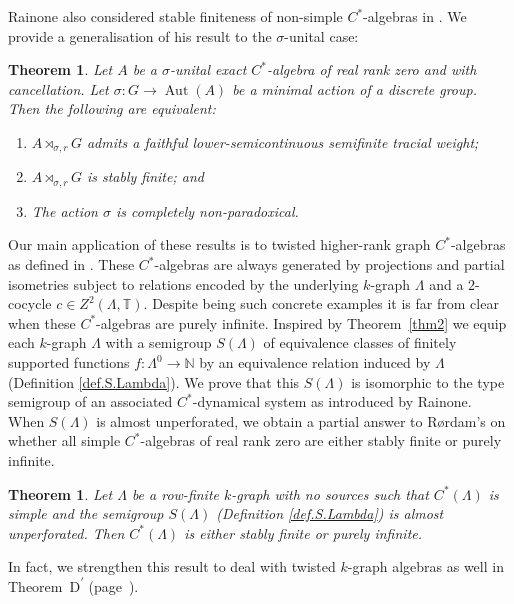\documentclass[a4paper, 12pt]{amsart}
\numberwithin{equation}{section}
\newcounter{theorem}
\newtheorem{thm}[theorem]{Theorem}
\theoremstyle{remark}
\theoremstyle{definition}
\begin{document}
Rainone also considered stable finiteness of non-simple $C^*$-algebras in
\cite[Theorem~1.2]{Rai}. We provide a generalisation of his result to the $\sigma$-unital
case:

\begin{thm}\label{thm2b}
Let $A$ be a $\sigma$-unital exact $C^*$-algebra of real rank zero and with cancellation.
Let $\sigma : G \to {\operatorname{Aut}}(A)$ be a minimal action of a discrete group. Then the following are equivalent:
\begin{enumerate}
\item $A\rtimes_{\sigma,r} G$ admits a faithful lower-semicontinuous semifinite
    tracial weight;
\item $A\rtimes_{\sigma,r} G$ is stably finite; and
\item The action $\sigma$ is completely non-paradoxical.
\end{enumerate}
\end{thm}

Our main application of these results is to twisted higher-rank graph $C^*$-algebras  as
defined in \cite{MR3335414}. These $C^*$-algebras are always generated by projections and
partial isometries subject to relations encoded by the underlying $k$-graph $\Lambda$ and
a $2$-cocycle $c \in Z^2 ( \Lambda , {\mathbb{T}} )$. Despite being such concrete examples it is
far from clear when these $C^*$-algebras are purely infinite. Inspired by
Theorem~\ref{thm2} we equip each $k$-graph $\Lambda$ with a semigroup $S(\Lambda)$ of
equivalence classes of finitely supported functions $f\colon \Lambda^0\to {\mathbb{N}}$ by an
equivalence relation induced by $\Lambda$ (Definition \ref{def.S.Lambda}). We prove that
this $S(\Lambda)$ is isomorphic to the type semigroup of an associated $C^*$-dynamical
system as introduced by Rainone. When $S(\Lambda)$ is almost unperforated, we obtain a
partial answer to R{\o}rdam's \cite[Question 2.6]{MR2275660} on whether all simple
$C^*$-algebras of real rank zero are either stably finite or purely infinite.

\begin{thm}\label{thm3}
Let $\Lambda$ be a row-finite $k$-graph with no sources such that $C^*(\Lambda)$ is
simple and the semigroup $S(\Lambda)$ (Definition \ref{def.S.Lambda}) is almost
unperforated. Then $C^*(\Lambda)$ is either stably finite or purely infinite.
\end{thm}

In fact, we strengthen this result to deal with twisted $k$-graph algebras as well in
Theorem~D\textsuperscript{$\prime$} (page~\pageref{thm.d*}).
\end{document}
